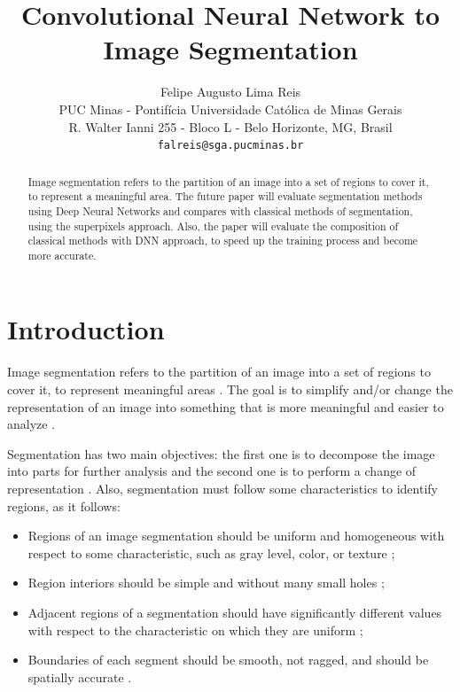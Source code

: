 \documentclass[10pt,twocolumn,letterpaper]{article}
\begin{document}
\title{Convolutional Neural Network to Image Segmentation}

\author{Felipe Augusto Lima Reis\\
PUC Minas - Pontif\'icia Universidade Cat\'olica de Minas Gerais\\
R. Walter Ianni 255 - Bloco L - Belo Horizonte, MG, Brasil\\
{\tt\small falreis@sga.pucminas.br}
}

\maketitle

\begin{abstract}
    Image segmentation refers to the partition of an image into a set of regions to cover it, to represent a meaningful area. The future paper will evaluate segmentation methods using Deep Neural Networks and compares with classical methods of segmentation, using the superpixels approach. Also, the paper will evaluate the composition of classical methods with DNN approach, to speed up the training process and become more accurate.
\end{abstract}

\section{Introduction} \label{introduction}

Image segmentation refers to the partition of an image into a set of regions to cover it, to represent meaningful areas \cite{DOMINGUEZ}. The goal is to simplify and/or change the representation of an image into something that is more meaningful and easier to analyze \cite{AHMED_SARMA}.

Segmentation has two main objectives: the first one is to decompose the image into parts for further analysis and the second one is to perform a change of representation \cite{DOMINGUEZ}. Also, segmentation must follow some characteristics to identify regions, as it follows:

\begin{itemize}
 \item Regions of an image segmentation should be uniform and homogeneous with respect to some characteristic, such as gray level, color, or texture \cite{DOMINGUEZ};
 \item Region interiors should be simple and without many small holes \cite{DOMINGUEZ};
 \item Adjacent regions of a segmentation should have significantly different values with respect to the characteristic on which they are uniform \cite{DOMINGUEZ};
 \item Boundaries of each segment should be smooth, not ragged, and should be spatially accurate \cite{DOMINGUEZ}.
\end{itemize}
\end{document}
